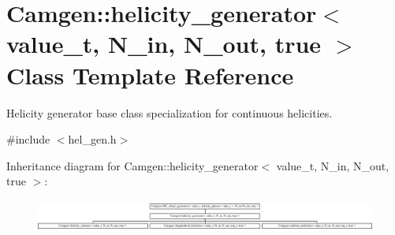 \hypertarget{a00268}{\section{Camgen\-:\-:helicity\-\_\-generator$<$ value\-\_\-t, N\-\_\-in, N\-\_\-out, true $>$ Class Template Reference}
\label{a00268}
}


Helicity generator base class specialization for continuous helicities.  




{\ttfamily \#include $<$hel\-\_\-gen.\-h$>$}

Inheritance diagram for Camgen\-:\-:helicity\-\_\-generator$<$ value\-\_\-t, N\-\_\-in, N\-\_\-out, true $>$\-:\begin{figure}[H]
\begin{center}
\leavevmode
\includegraphics[height=1.062618cm]{a00268}
\end{center}
\end{figure}
